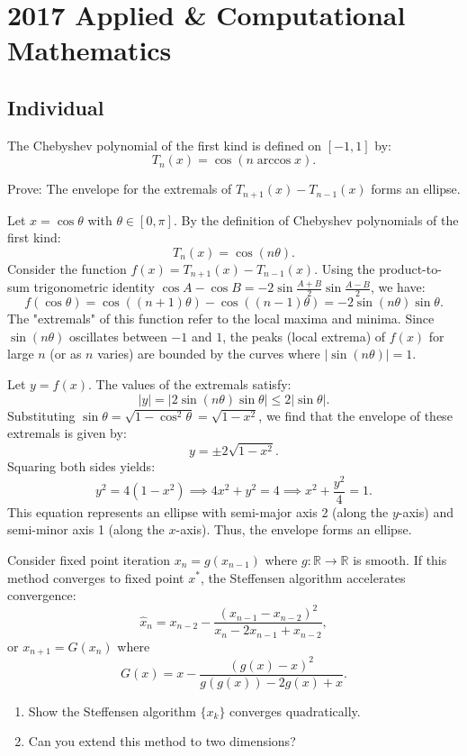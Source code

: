 \section{2017 Applied \& Computational Mathematics}

\subsection{Individual}

\begin{exercise}
\label{applied:2017:1}
The Chebyshev polynomial of the first kind is defined on $[-1,1]$ by:
\[
T_{n}(x)=\cos(n\arccos x).
\]

Prove: The envelope for the extremals of $T_{n+1}(x)-T_{n-1}(x)$ forms an ellipse.
\end{exercise}

\begin{solution}
Let $x = \cos \theta$ with $\theta \in [0, \pi]$. By the definition of Chebyshev polynomials of the first kind:
\[
T_{n}(x) = \cos(n\theta).
\]
Consider the function $f(x) = T_{n+1}(x) - T_{n-1}(x)$. Using the product-to-sum trigonometric identity $\cos A - \cos B = -2 \sin \frac{A+B}{2} \sin \frac{A-B}{2}$, we have:
\[
f(\cos \theta) = \cos((n+1)\theta) - \cos((n-1)\theta) = -2 \sin(n\theta) \sin \theta.
\]
The "extremals" of this function refer to the local maxima and minima. Since $\sin(n\theta)$ oscillates between $-1$ and $1$, the peaks (local extrema) of $f(x)$ for large $n$ (or as $n$ varies) are bounded by the curves where $|\sin(n\theta)| = 1$. 

Let $y = f(x)$. The values of the extremals satisfy:
\[
|y| = |2 \sin(n\theta) \sin \theta| \leq 2 |\sin \theta|.
\]
Substituting $\sin \theta = \sqrt{1 - \cos^2 \theta} = \sqrt{1 - x^2}$, we find that the envelope of these extremals is given by:
\[
y = \pm 2 \sqrt{1 - x^2}.
\]
Squaring both sides yields:
\[
y^2 = 4(1 - x^2) \implies 4x^2 + y^2 = 4 \implies x^2 + \frac{y^2}{4} = 1.
\]
This equation represents an ellipse with semi-major axis 2 (along the $y$-axis) and semi-minor axis 1 (along the $x$-axis). Thus, the envelope forms an ellipse.
\end{solution}

\begin{exercise}
\label{applied:2017:2}
Consider fixed point iteration $x_{n}=g(x_{n-1})$ where $g:\mathbb{R}\to\mathbb{R}$ is smooth. If this method converges to fixed point $x^{*}$, the Steffensen algorithm accelerates convergence:
\[
\hat{x}_{n}=x_{n-2}-\frac{(x_{n-1}-x_{n-2})^{2}}{x_{n}-2x_{n-1}+x_{n-2}},
\]
or $x_{n+1}=G(x_{n})$ where
\[
G(x)=x-\frac{(g(x)-x)^{2}}{g(g(x))-2g(x)+x}.
\]

\begin{enumerate}
\item[(a)] Show the Steffensen algorithm $\{x_{k}\}$ converges quadratically.
\item[(b)] Can you extend this method to two dimensions?
\end{enumerate}
\end{exercise}

